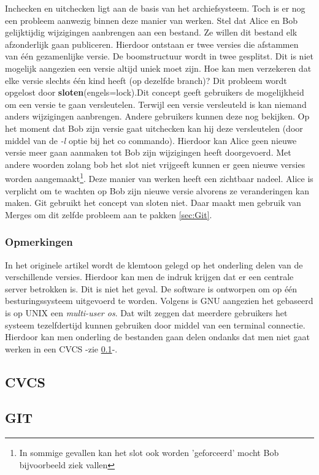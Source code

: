 Inchecken en uitchecken ligt aan de basis van het archiefsysteem. Toch is er nog een probleem aanwezig binnen deze manier van werken. Stel dat Alice en Bob gelijktijdig wijzigingen aanbrengen aan een bestand. Ze willen dit bestand elk afzonderlijk gaan publiceren.  Hierdoor ontstaan er twee versies die afstammen van één gezamenlijke versie. De boomstructuur wordt in twee gesplitst. Dit is niet mogelijk aangezien een versie altijd uniek moet zijn. Hoe kan men verzekeren dat elke versie slechts één kind heeft (op dezelfde branch)? Dit probleem wordt opgelost door \textbf{sloten}(engels=lock).Dit concept geeft gebruikers de mogelijkheid om een versie te gaan versleutelen. Terwijl een versie versleuteld is kan niemand anders wijzigingen aanbrengen. Andere gebruikers kunnen deze nog bekijken. Op het moment dat Bob zijn versie gaat uitchecken kan hij deze versleutelen (door middel van de \textit{-l} optie bij het co commando). Hierdoor kan Alice geen nieuwe versie meer gaan aanmaken tot Bob zijn wijzigingen heeft doorgevoerd. Met andere woorden zolang bob het slot niet vrijgeeft kunnen er geen nieuwe versies worden aangemaakt\footnote{In sommige gevallen kan het slot ook worden 'geforceerd' mocht Bob bijvoorbeeld ziek vallen}. Deze manier van werken heeft een zichtbaar nadeel. Alice is verplicht om te wachten op Bob zijn nieuwe versie alvorens ze veranderingen kan maken. Git gebruikt het concept van sloten niet. Daar maakt men gebruik van Merges om dit zelfde probleem aan te pakken \ref{sec:Git}.


\label{par:branches}

\subsubsection{Opmerkingen}
In het originele artikel wordt de klemtoon gelegd op het onderling delen van de verschillende versies. Hierdoor kan men de indruk krijgen dat er een centrale server betrokken is. Dit is niet het geval. De software is ontworpen om op één besturingssysteem uitgevoerd te worden. Volgens \textcite{Debian2020} is GNU aangezien het gebaseerd is op UNIX een \textit{multi-user os}. Dat wilt zeggen dat meerdere gebruikers het systeem tezelfdertijd kunnen gebruiken door middel van een terminal connectie. Hierdoor kan men onderling de bestanden gaan delen ondanks dat men niet gaat werken in een CVCS -zie \ref{sec:CVCS}-.

\subsection{CVCS}
\label{sec:CVCS}

\subsection{GIT}
\label{sec:GIT}
